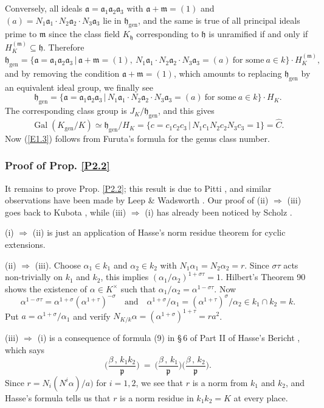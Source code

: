 \documentclass{amsart}
\newcommand{\fa}{{\mathfrak a}}
\newcommand{\fp}{{\mathfrak p}}
\newcommand{\fh}{{\mathfrak h}}
\newcommand{\fm}{{\mathfrak m}}
\newcommand{\hC}{\widehat{C}}
\newcommand{\sth}{\,|\,}
\newcommand{\Gal}{\operatorname{Gal}}
\newcommand{\Lra}{\Longrightarrow}
\newcommand{\gen}{{\operatorname{gen}}}
\begin{document}
Conversely, all ideals $\fa = \fa_1 \fa_2 \fa_3$ with
$\fa + \fm = (1)$ and
$(a) = N_1 \fa_1 \cdot N_2 \fa_2 \cdot N_3 \fa_3$ lie in
$\fh_\gen$, and the same is true of all principal ideals
prime to $\fm$ since the class field $K_\fh$ corresponding
to $\fh$ is unramified if and only if
$H_K^{(\fm)} \subseteq \fh$. Therefore
$$ \fh_\gen = \{ \fa = \fa_1 \fa_2 \fa_3 \sth
   \fa + \fm = (1), \
   N_1 \fa_1 \cdot N_2 \fa_2 \cdot N_3 \fa_3 = (a)
   \ \text{for some}\ a \in k\} \cdot H_K^{(\fm)}, $$
and by removing the condition $\fa + \fm = (1)$, which
amounts to replacing $\fh_\gen$ by an equivalent ideal
group, we finally see
$$ \fh_\gen = \{ \fa = \fa_1 \fa_2 \fa_3 \sth
   N_1 \fa_1 \cdot N_2 \fa_2 \cdot N_3 \fa_3 = (a)
   \ \text{for some}\ a \in k\} \cdot H_K. $$
The corresponding class group is $J_K/\fh_\gen$, and this gives
$$ \Gal(K_\gen/K) \simeq \fh_\gen/H_K =
   \{c = c_1c_2c_3 \sth N_1 c_1 N_2 c_2 N_3 c_3 = 1\} = \hC.$$
Now (\ref{E1.3}) follows from Furuta's formula for the genus
class number.


\subsubsection*{Proof of Prop. \ref{P2.2}}
It remains to prove Prop. \ref{P2.2}; this result is due to
Pitti \cite{Pi1,Pi2,Pi3}, and similar observations have been
made by Leep \& Wadsworth \cite{LW1,LW2}. Our proof of (ii)
$\Lra$ (iii) goes back to Kubota \cite[Hilfssatz 14]{Kub1},
while (iii) $\Lra$ (i) has already been noticed by Scholz
\cite[p.  102]{Sch1}.

(i) $\Lra$ (ii) is just an application of Hasse's norm residue
theorem for cyclic extensions.

(ii) $\Lra$ (iii). Choose $\alpha_1 \in k_1$ and $\alpha_2 \in k_2$
with $N_1 \alpha_1 = N_2 \alpha_2 = r$. Since $\sigma\tau$ acts
non-trivially on $k_1$ and $k_2$, this implies
$(\alpha_1/\alpha_2)^{1+\sigma\tau} = 1$. Hilbert's Theorem 90
shows the existence of $\alpha \in K^\times$ such that
$\alpha_1/\alpha_2 = \alpha^{1-\sigma\tau}$. Now
$$ \alpha^{1-\sigma\tau} =
   \alpha^{1+\sigma}(\alpha^{1+\tau})^{-\sigma}
     \quad \text{and} \quad
   \alpha^{1+\sigma}/\alpha_1 = (\alpha^{1+\tau})^\sigma/\alpha_2
      \in k_1 \cap k_2 = k. $$
Put $a = \alpha^{1+\sigma}/\alpha_1$ and verify
$N_{K/k} \alpha = (\alpha^{1+\sigma})^{1+\tau} = ra^2$.

(iii) $\Lra$ (i) is a consequence of formula (9) in \S\,6 of
Part II of Hasse's Bericht \cite{HasB}, which says
$$ \Big(\frac{\beta\,,\, k_1k_2}{\fp}\Big) \ = \
   \Big(\frac{\beta\,,\, k_1}{\fp}\Big)
   \Big(\frac{\beta\,,\, k_2}{\fp}\Big). $$
Since $r = N_i(N^i \alpha)/a)$ for $i = 1, 2$, we see that
$r$ is a norm from $k_1$ and $k_2$, and Hasse's formula tells
us that $r$ is a norm residue in $k_1k_2 = K$ at every place.
\end{document}
